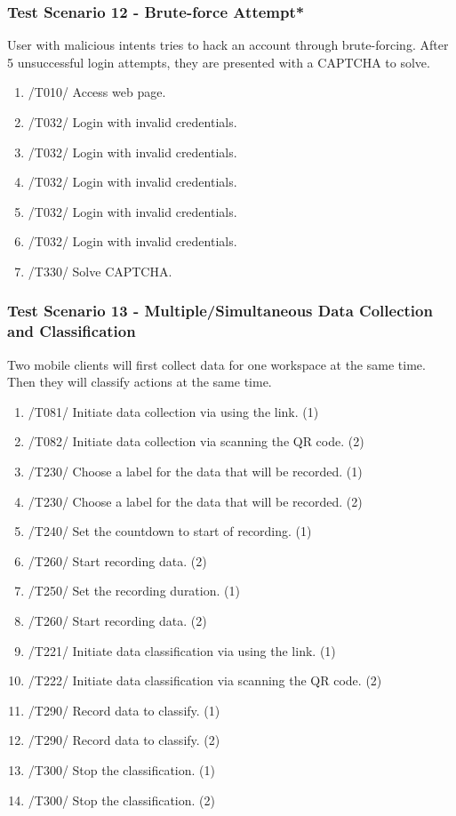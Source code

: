 \subsubsection{Test Scenario 12 - Brute-force Attempt*}
User with malicious intents tries to hack an account through brute-forcing. After 5 unsuccessful login attempts, they are presented with a \gls{CAPTCHA} to solve.
\begin{enumerate}
    \item /T010/ Access web page.
    \item /T032/ Login with invalid credentials.
    \item /T032/ Login with invalid credentials.
    \item /T032/ Login with invalid credentials.
    \item /T032/ Login with invalid credentials.
    \item /T032/ Login with invalid credentials.
    \item /T330/ Solve \gls{CAPTCHA}.
\end{enumerate}
\subsubsection{Test Scenario 13 - Multiple/Simultaneous Data Collection and Classification}
Two mobile clients will first collect data for one workspace at the same time. Then they will classify actions at the same time.
\begin{enumerate}
    \item /T081/ Initiate data collection via using the link. (1)
    \item /T082/ Initiate data collection via scanning the \gls{QR code}. (2)
    \item /T230/ Choose a \gls{label} for the data that will be recorded. (1)
    \item /T230/ Choose a \gls{label} for the data that will be recorded. (2)
    \item /T240/ Set the countdown to start of recording. (1)
    \item /T260/ Start recording data. (2)
    \item /T250/ Set the recording duration. (1)
    \item /T260/ Start recording data. (2)
    \item /T221/ Initiate data \gls{classification} via using the link. (1)
    \item /T222/ Initiate data \gls{classification} via scanning the QR code. (2)
    \item /T290/ Record data to classify. (1)
    \item /T290/ Record data to classify. (2)
    \item /T300/ Stop the \gls{classification}. (1)
    \item /T300/ Stop the \gls{classification}. (2)
\end{enumerate}